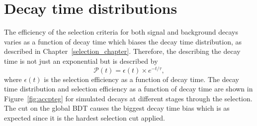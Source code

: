 \section{Decay time distributions}
\label{sec:DTpdfs}
The efficiency of the selection criteria for both signal and background decays varies as a function of decay time which biases the decay time distribution, as described in Chapter~\ref{selection_chapter}. Therefore, the \pdf describing the decay time is not just an exponential but is described by 
\begin{equation}
\mathcal{P}(t) = \epsilon(t) \times e^{-t/\tau},
\label{eq:DTpdf}
\end{equation}
where $\epsilon(t)$ is the selection efficiency as a function of decay time. 
The decay time distribution and selection efficiency as a function of decay time are shown in Figure~\ref{fig:accpteg} for simulated \bsmumu decays at different stages through the selection. The cut on the global BDT causes the biggest decay time bias which is as expected since it is the hardest selection cut applied. %
